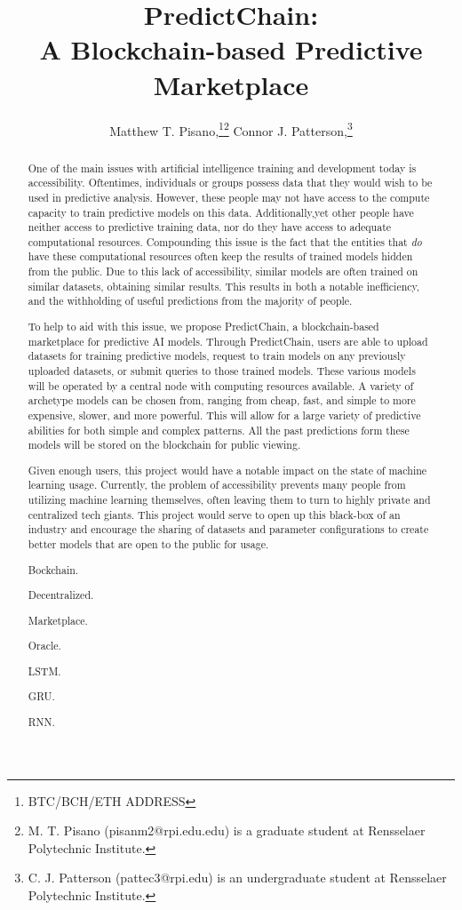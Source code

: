 \documentclass{ledger}
\title{PredictChain:\\
A Blockchain-based Predictive Marketplace}
\author{
    Matthew T. Pisano,\thanks{BTC/BCH/ETH ADDRESS}\thanks{M. T. Pisano (pisanm2@rpi.edu.edu) is a graduate
    student at Rensselaer Polytechnic Institute.} 
    Connor J. Patterson,\thanks{C. J. Patterson (pattec3@rpi.edu) is an undergraduate student at
    Rensselaer Polytechnic Institute.}
}
\begin{document}
\maketitle

\thispagestyle{pagefirst}

\begin{abstract}
One of the main issues with artificial intelligence training and development today is accessibility. Oftentimes,
individuals or groups possess data that they would wish to be used in predictive analysis. However, these people
may not have access to the compute capacity to train predictive models on this data.  Additionally,yet other
people have neither access to predictive training data, nor do they have access to adequate computational resources.
Compounding this issue is the fact that the entities that \textit{do} have these computational resources often keep the
results of trained models hidden from the public.  Due to this lack of accessibility, similar models are often trained
on similar datasets, obtaining similar results.  This results in both a notable inefficiency, and the withholding of
useful predictions from the majority of people.

\quad To help to aid with this issue, we propose PredictChain, a blockchain-based marketplace for predictive AI models.
Through PredictChain, users are able to upload datasets for training predictive models, request to train models on any
previously uploaded datasets, or submit queries to those trained models.  These various models will be operated by a
central node with computing resources available. A variety of archetype models can be chosen from, ranging from cheap,
fast, and simple to more expensive, slower, and more powerful.  This will allow for a large variety of predictive
abilities for both simple and complex patterns.  All the past predictions form these models will be stored on the
blockchain for public viewing.

\quad Given enough users, this project would have a notable impact on the state of machine learning usage.  Currently,
the problem of accessibility prevents many people from utilizing machine learning themselves, often leaving them to
turn to highly private and centralized tech giants.  This project would serve to open up this black-box of
an industry and encourage the sharing of datasets and parameter configurations to create better models that are open
to the public for usage.

\begin{keywords}
\item Bockchain.
\item Decentralized.
\item Marketplace.
\item Oracle.
\item LSTM.
\item GRU.
\item RNN.
\end{keywords}
\end{abstract}
\end{document}
